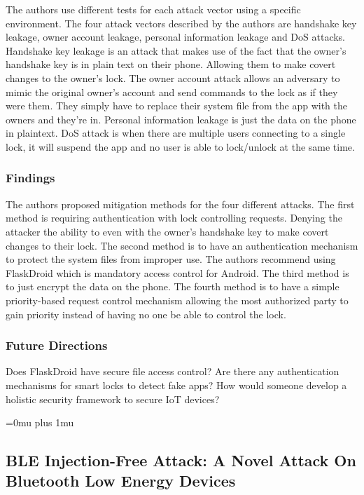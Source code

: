 \noindent
The authors use different tests for each attack vector using a specific environment. The four attack vectors described by the authors are handshake key leakage, owner account leakage, personal information leakage and DoS attacks. Handshake key leakage is an attack that makes use of the fact that the owner’s handshake key is in plain text on their phone. Allowing them to make covert changes to the owner’s lock. The owner account attack allows an adversary to mimic the original owner’s account and send commands to the lock as if they were them. They simply have to replace their system file from the app with the owners and they’re in. Personal information leakage is just the data on the phone in plaintext. DoS attack is when there are multiple users connecting to a single lock, it will suspend the app and no user is able to lock/unlock at the same time.

\subsubsection{Findings}

\noindent
The authors proposed mitigation methods for the four different attacks. The first method is requiring authentication with lock controlling requests. Denying the attacker the ability to even with the owner’s handshake key to make covert changes to their lock. The second method is to have an authentication mechanism to protect the system files from improper use. The authors recommend using FlaskDroid which is mandatory access control for Android. The third method is to just encrypt the data on the phone. The fourth method is to have a simple priority-based request control mechanism allowing the most authorized party to gain priority instead of having no one be able to control the lock.

\subsubsection{Future Directions}

\noindent
Does FlaskDroid have secure file access control? Are there any authentication mechanisms for smart locks to detect fake apps? How would someone develop a holistic security framework to secure IoT devices?

\Urlmuskip=0mu plus 1mu\relax

\noindent
\subsection{BLE Injection-Free Attack: A Novel Attack On Bluetooth Low Energy Devices}

